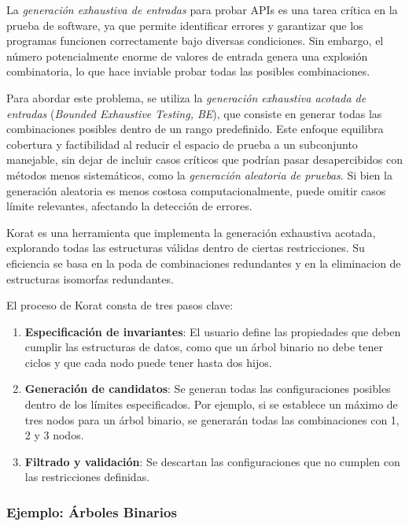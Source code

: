 La \textit{generación exhaustiva de entradas} para probar APIs es una tarea crítica en la prueba de software, ya que permite identificar errores y garantizar que los programas funcionen correctamente bajo diversas condiciones. Sin embargo, el número potencialmente enorme de valores de entrada genera una explosión combinatoria, lo que hace inviable probar todas las posibles combinaciones.

Para abordar este problema, se utiliza la \textit{generación exhaustiva acotada de entradas} (\textit{Bounded Exhaustive Testing, BE}), que consiste en generar todas las combinaciones posibles dentro de un rango predefinido. Este enfoque equilibra cobertura y factibilidad al reducir el espacio de prueba a un subconjunto manejable, sin dejar de incluir casos críticos que podrían pasar desapercibidos con métodos menos sistemáticos, como la \textit{generación aleatoria de pruebas}. Si bien la generación aleatoria es menos costosa computacionalmente, puede omitir casos límite relevantes, afectando la detección de errores.

Korat es una herramienta que implementa la generación exhaustiva acotada, explorando todas las estructuras válidas dentro de ciertas restricciones. Su eficiencia se basa en la poda de combinaciones redundantes y en la eliminacion de estructuras isomorfas redundantes.

El proceso de Korat consta de tres pasos clave:

\begin{enumerate}
    \item \textbf{Especificación de invariantes}: El usuario define las propiedades que deben cumplir las estructuras de datos, como que un árbol binario no debe tener ciclos y que cada nodo puede tener hasta dos hijos.
    \item \textbf{Generación de candidatos}: Se generan todas las configuraciones posibles dentro de los límites especificados. Por ejemplo, si se establece un máximo de tres nodos para un árbol binario, se generarán todas las combinaciones con 1, 2 y 3 nodos.
    \item \textbf{Filtrado y validación}: Se descartan las configuraciones que no cumplen con las restricciones definidas.
\end{enumerate}

\subsubsection{Ejemplo: Árboles Binarios}


